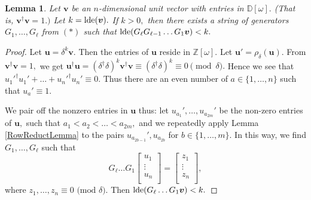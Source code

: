 \documentclass{dalthesis}
\theoremstyle{theorem}
\newtheorem{lemma}[theorem]{Lemma}
\theoremstyle{definition}
\theoremstyle{definition}  %
\theoremstyle{definition}
\newcommand{\Z}{\mathbb{Z}}
\newcommand{\D}{\mathbb{D}}
\newcommand{\ay}{a}
\newcommand{\bee}{b}
\renewcommand{\:}{\mathbin{:}}
\newcommand{\lde}{\mathop{\rm lde}\nolimits}
\begin{document}
\begin{lemma}
\label{ColStepLemma}
Let $\boldsymbol{v}$ be an $n$-dimensional unit vector with entries in $\D[\omega].$ (That is, $\boldsymbol{v}^{\dagger}\boldsymbol{v} = 1.)$ Let $k = \lde(\boldsymbol{v}).$ If $k > 0,$ then there exists a string of generators $G_1,\ldots,G_\ell$ from $(*)$ such that $\lde(G_\ell G_{\ell-1}\ldots G_1\boldsymbol{v}) < k.$
\end{lemma}
\begin{proof}
Let $\boldsymbol{u} = \delta^k\boldsymbol{v}.$ Then the entries of $\boldsymbol{u}$ reside in $\Z[\omega].$ Let $\boldsymbol{u'} = \rho_\delta(\boldsymbol{u}).$ From $\boldsymbol{v}^\dagger\boldsymbol{v} = 1,$ we get $\boldsymbol{u}^\dagger\boldsymbol{u} = (\delta^\dagger\delta)^k\boldsymbol{v}^\dagger\boldsymbol{v} \equiv (\delta^\dagger\delta)^k\equiv 0\pmod{\delta}.$ Hence we see that $u_1'^\dagger u_1' + \ldots +u_n'^\dagger u_n' \equiv 0.$ Thus there are an even number of $\ay\in\{1,\ldots,n\}$ such that $u_\ay' \equiv 1.$

We pair off the nonzero entries in $\boldsymbol{u}$ thus: let $u_{\ay_1}',\ldots,u_{\ay_{2m}}'$ be the non-zero entries of $\boldsymbol{u},$ such that $\ay_1<\ay_2<\ldots<\ay_{2m},$ and we repeatedly apply Lemma \ref{RowReductLemma} to the pairs $u_{\ay_{2\bee-1}}',u_{\ay_{2\bee}}$ for $\bee\in\{1,\ldots,m\}.$ In this way, we find $G_1,\ldots,G_\ell$ such that \[G_\ell\ldots  G_1\left[\begin{array}{c}
u_1\\
\vdots\\
u_n\\
\end{array}\right] = \left[\begin{array}{c}
z_1\\
\vdots\\
z_n\\
\end{array}\right],\] where $z_1,\ldots,z_n\equiv 0\mbox{ (mod }\delta).$ 
Then $\lde(G_\ell\ldots G_1\boldsymbol{v}) < k.$
\end{proof}
\end{document}
